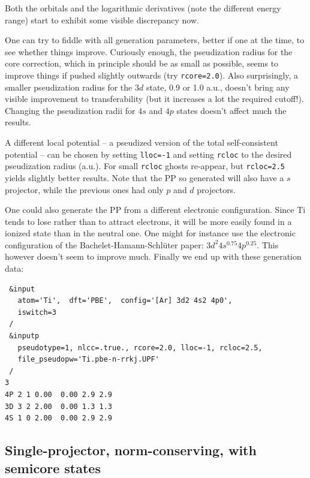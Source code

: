 \documentclass[12pt,a4paper]{article}
\begin{document}
Both the orbitals and the logarithmic derivatives (note the 
different energy range) start to exhibit some visible
discrepancy now.

One can try to fiddle with all generation parameters,
better if one at the time, to see whether things improve.
Curiously enough, the pseudization radius for the core
correction, which in principle should be as small as
possible, seems to improve things if pushed slightly 
outwards (try \texttt{rcore=2.0}). Also surprisingly,
a smaller pseudization radius for the $3d$ state, 0.9 
or 1.0 a.u., doesn't bring any visible improvement 
to transferability
(but it increases a lot the required cutoff!).
Changing the pseudization radii for $4s$ and $4p$ states
doesn't affect much the results. 

A different local potential -- a pseudized version 
of the total self-consistent potential -- can be chosen 
by setting \texttt{lloc=-1} and setting \texttt{rcloc}
to the desired pseudization radius (a.u.). For small 
\texttt{rcloc} ghosts re-appear, but  \texttt{rcloc=2.5} 
yields slightly better results. Note that the PP so 
generated will also have a $s$ projector, while the previous
ones had only $p$ and $d$ projectors. 

One could also generate the PP from a different electronic 
configuration. Since Ti tends to lose rather than to attract
electrons, it will be more easily found in a ionized state than
in the neutral one. One might for instance use the electronic
configuration of the Bachelet-Hamann-Schl\"uter paper\cite{BHS}:
$3d^2 4s^{0.75} 4p^{0.25}$. This however doesn't seem to improve
much. Finally we end up with these generation data:
\begin{verbatim}
 &input
   atom='Ti',  dft='PBE',  config='[Ar] 3d2 4s2 4p0',
   iswitch=3
 /
 &inputp
   pseudotype=1, nlcc=.true., rcore=2.0, lloc=-1, rcloc=2.5,
   file_pseudopw='Ti.pbe-n-rrkj.UPF'
 /
3
4P 2 1 0.00  0.00 2.9 2.9
3D 3 2 2.00  0.00 1.3 1.3
4S 1 0 2.00  0.00 2.9 2.9
\end{verbatim}

\subsection {Single-projector, norm-conserving, with semicore states}
\end{document}
